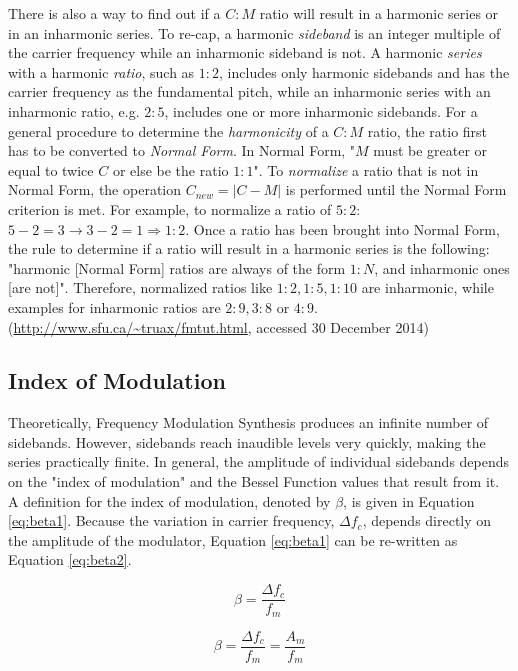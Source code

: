\documentclass[12pt,twoside]{report}
\begin{document}
\noindent There is also a way to find out if a $C:M$ ratio will result in a harmonic series or in an inharmonic series. To re-cap, a harmonic \emph{sideband} is an integer multiple of the carrier frequency while an inharmonic sideband is not. A harmonic \emph{series} with a harmonic \emph{ratio}, such as $1:2$, includes only harmonic sidebands and has the carrier frequency as the fundamental pitch, while an inharmonic series with an inharmonic ratio, e.g. $2:5$, includes one or more inharmonic sidebands. For a general procedure to determine the \emph{harmonicity} of a $C:M$ ratio, the ratio first has to be converted to \emph{Normal Form}. In Normal Form, "$M$ must be greater or equal to twice $C$ or else be the ratio $1:1$". To \emph{normalize} a ratio that is not in Normal Form, the operation $C_{new} = | C - M |$ is performed until the Normal Form criterion is met. For example, to normalize a ratio of $5:2$: $5 - 2 = 3 \rightarrow 3 - 2 = 1 \Rightarrow 1:2$. Once a ratio has been brought into Normal Form, the rule to determine if a ratio will result in a harmonic series is the following: "harmonic [Normal Form] ratios are always of the form $1:N$, and inharmonic ones [are not]". Therefore, normalized ratios like
$1:2, 1:5, 1:10$ are inharmonic, while examples for inharmonic ratios are $2:9, 3:8 \text{ or } 4:9$.
(\url{http://www.sfu.ca/~truax/fmtut.html}, accessed 30 December 2014)

\subsection{Index of Modulation}

Theoretically, Frequency Modulation Synthesis produces an infinite number of sidebands. However, sidebands reach inaudible levels very quickly, making the series practically finite. In general, the amplitude of individual sidebands depends on the "index of modulation" and the Bessel Function values that result from it. A definition for the index of modulation, denoted by $\beta$, is given in Equation \ref{eq:beta1}. Because the variation in carrier frequency, $\Delta f_{c}$, depends directly on the amplitude of the modulator, Equation \ref{eq:beta1} can be re-written as Equation \ref{eq:beta2}.

\begin{multicols}{2}

  \begin{equation}
    \beta = \frac{\Delta f_{c}}{f_{m}}
    \label{eq:beta1}
  \end{equation}

  \begin{equation}
    \beta = \frac{\Delta f_{c}}{f_{m}} = \frac{A_{m}}{f_{m}}
    \label{eq:beta2}
  \end{equation}

\end{multicols}
\end{document}
